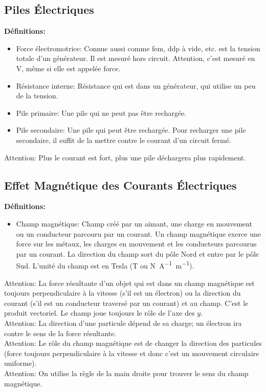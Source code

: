 \documentclass[french, a4paper, 12pt]{article}
\begin{document}
\subsection{Piles Électriques}
\textbf{Définitions:}
\begin{itemize}
\item Force électromotrice: Connue aussi comme fem, ddp à vide, etc. est la tension totale d'un générateur. Il est mesuré hors circuit. Attention, c'est mesuré en \si{\volt}, même si elle est appelée force.
\item Résistance interne: Résistance qui est dans un générateur, qui utilise un peu de la tension.
\item Pile primaire: Une pile qui ne peut pas être rechargée.
\item Pile secondaire: Une pile qui peut être rechargée. Pour recharger une pile secondaire, il suffit de la mettre contre le courant d'un circuit fermé.
\end{itemize}
Attention: Plus le courant est fort, plus une pile déchargera plus rapidement.

\subsection{Effet Magnétique des Courants Électriques}
\textbf{Définitions:}
\begin{itemize}
\item Champ magnétique: Champ créé par un aimant, une charge en mouvement ou un conducteur parcouru par un courant. Un champ magnétique exerce une force sur les métaux, les charges en mouvement et les conducteurs parcourus par un courant. La direction du champ sort du pôle Nord et entre par le pôle Sud. L'unité du champ est en Tesla (\si{T} ou \si{N.A^{-1}.m^{-1}}). 
\end{itemize}
Attention: La force résultante d'un objet qui est dans un champ magnétique est toujours perpendiculaire à la vitesse (s'il est un électron) ou la direction du courant (s'il est un conducteur traversé par un courant) et au champ. C'est le produit vectoriel. Le champ joue toujours le rôle de l'axe des $y$.\\
Attention: La direction d'une particule dépend de sa charge; un électron ira contre le sens de la force résultante.\\
Attention: Le rôle du champ magnétique est de changer la direction des particules (force toujours perpendiculaire à la vitesse et donc c'est un mouvement circulaire uniforme).\\
Attention: On utilise la règle de la main droite pour trouver le sens du champ magnétique.
\pagebreak
\end{document}
